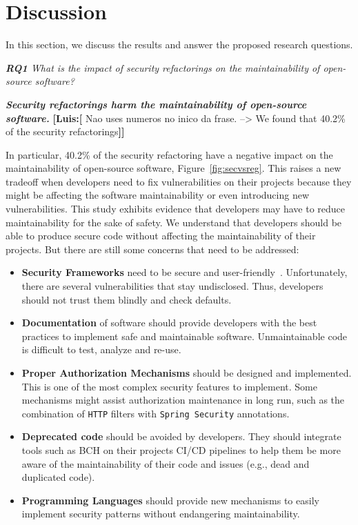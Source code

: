 \documentclass[10pt,conference]{IEEEtran}
\newcommand{\Luis}[1]{\textbf{[Luis:[}{\color{green} #1}\textbf{]]}}
\begin{document}
{\section{Discussion}\label{sec:discussion}

In this section, we discuss the results and answer the proposed research questions.

\begin{framed}
\textit{\textbf{RQ1} What is the impact of security refactorings on the maintainability
of open-source software?}
\end{framed}

\textbf{\textit{Security refactorings harm the maintainability of open-source software.}}
\Luis{Nao uses numeros no inico da frase. --> We found that 40.2\% of the security refactorings}

In particular, 40.2\% of the security refactoring have a negative impact on the
maintainability of open-source software, Figure~\ref{fig:secvsreg}. This raises
a new tradeoff when developers need to fix vulnerabilities on their projects
because they might be affecting the software maintainability or even introducing
new vulnerabilities. This study exhibits evidence that developers may have to
reduce maintainability for the sake of safety. We understand that developers
should be able to produce secure code without affecting the maintainability of
their projects. But there are still some concerns that need to be addressed:
\begin{itemize}
	\item \textbf{Security Frameworks} need to be secure and user-friendly~\cite{5287006, 7676144}. Unfortunately,
	there are several vulnerabilities that stay undisclosed. Thus, developers should not
	trust them blindly and check defaults.
	\item \textbf{Documentation} of software should provide developers with the best practices to implement safe and maintainable software. Unmaintainable code is difficult to test, analyze and re-use.
	\item \textbf{Proper Authorization Mechanisms} should be designed and implemented. This is
	one of the most complex security features to implement. Some mechanisms might assist authorization maintenance in long run, such as the combination of \texttt{HTTP} filters with \texttt{Spring Security} annotations.
	\item \textbf{Deprecated code} should be avoided by developers. They should integrate tools such as BCH on their projects CI/CD pipelines to help them be more aware of the maintainability of their code and issues (e.g., dead and duplicated code).
	\item\textbf{Programming Languages} should provide new mechanisms to easily implement security patterns without endangering maintainability.


\end{itemize}}
\end{document}
